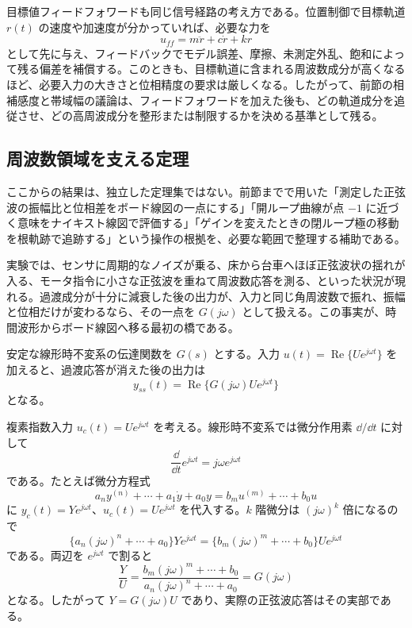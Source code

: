 目標値フィードフォワードも同じ信号経路の考え方である。位置制御で目標軌道 $r(t)$ の速度や加速度が分かっていれば、必要な力を
\begin{equation}
  u_{ff}=m\ddot{r}+c\dot{r}+kr
\end{equation}
として先に与え、フィードバックでモデル誤差、摩擦、未測定外乱、飽和によって残る偏差を補償する。このときも、目標軌道に含まれる周波数成分が高くなるほど、必要入力の大きさと位相精度の要求は厳しくなる。したがって、前節の相補感度と帯域幅の議論は、フィードフォワードを加えた後も、どの軌道成分を追従させ、どの高周波成分を整形または制限するかを決める基準として残る。

\subsection{周波数領域を支える定理}

ここからの結果は、独立した定理集ではない。前節までで用いた「測定した正弦波の振幅比と位相差をボード線図の一点にする」「開ループ曲線が点 $-1$ に近づく意味をナイキスト線図で評価する」「ゲインを変えたときの閉ループ極の移動を根軌跡で追跡する」という操作の根拠を、必要な範囲で整理する補助である。

実験では、センサに周期的なノイズが乗る、床から台車へほぼ正弦波状の揺れが入る、モータ指令に小さな正弦波を重ねて周波数応答を測る、といった状況が現れる。過渡成分が十分に減衰した後の出力が、入力と同じ角周波数で振れ、振幅と位相だけが変わるなら、その一点を $G(j\omega)$ として扱える。この事実が、時間波形からボード線図へ移る最初の橋である。

\begin{theorem}[正弦波定常応答の定理]
安定な線形時不変系の伝達関数を $G(s)$ とする。入力 $u(t)=\operatorname{Re}\{Ue^{j\omega t}\}$ を加えると、過渡応答が消えた後の出力は
\begin{equation}
  y_{ss}(t)=\operatorname{Re}\{G(j\omega)Ue^{j\omega t}\}
\end{equation}
となる。
\end{theorem}

\begin{derivation}
複素指数入力 $u_c(t)=Ue^{j\omega t}$ を考える。線形時不変系では微分作用素 $\dd/\dd t$ に対して
\begin{equation}
  \frac{\dd}{\dd t}e^{j\omega t}=j\omega e^{j\omega t}
\end{equation}
である。たとえば微分方程式
\begin{equation}
  a_n y^{(n)}+\cdots+a_1\dot{y}+a_0y
  =b_m u^{(m)}+\cdots+b_0u
\end{equation}
に $y_c(t)=Ye^{j\omega t}$、$u_c(t)=Ue^{j\omega t}$ を代入する。$k$ 階微分は $(j\omega)^k$ 倍になるので
\begin{equation}
  \{a_n(j\omega)^n+\cdots+a_0\}Ye^{j\omega t}
  =\{b_m(j\omega)^m+
  \cdots+b_0\}Ue^{j\omega t}
\end{equation}
である。両辺を $e^{j\omega t}$ で割ると
\begin{equation}
  \frac{Y}{U}=\frac{b_m(j\omega)^m+\cdots+b_0}{a_n(j\omega)^n+\cdots+a_0}=G(j\omega)
\end{equation}
となる。したがって $Y=G(j\omega)U$ であり、実際の正弦波応答はその実部である。
\end{derivation}


